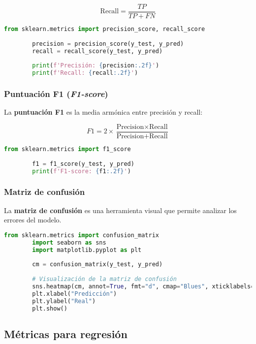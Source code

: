 \documentclass{book}
\begin{document}
	\[
	\text{Recall} = \frac{TP}{TP + FN}
	\]
	
	\begin{lstlisting}[language=Python, caption=Cálculo de precisión y recall]
		from sklearn.metrics import precision_score, recall_score
		
		precision = precision_score(y_test, y_pred)
		recall = recall_score(y_test, y_pred)
		
		print(f'Precisión: {precision:.2f}')
		print(f'Recall: {recall:.2f}')
	\end{lstlisting}
	
	\subsubsection{Puntuación F1 (\textit{F1-score})}
	
	La \textbf{puntuación F1} es la media armónica entre precisión y recall:
	
	\[
	F1 = 2 \times \frac{\text{Precision} \times \text{Recall}}{\text{Precision} + \text{Recall}}
	\]
	
	\begin{lstlisting}[language=Python, caption=Cálculo de F1-score]
		from sklearn.metrics import f1_score
		
		f1 = f1_score(y_test, y_pred)
		print(f'F1-score: {f1:.2f}')
	\end{lstlisting}
	
	\subsubsection{Matriz de confusión}
	
	La \textbf{matriz de confusión} es una herramienta visual que permite analizar los errores del modelo.
	
	\begin{lstlisting}[language=Python, caption=Matriz de confusión]
		from sklearn.metrics import confusion_matrix
		import seaborn as sns
		import matplotlib.pyplot as plt
		
		cm = confusion_matrix(y_test, y_pred)
		
		# Visualización de la matriz de confusión
		sns.heatmap(cm, annot=True, fmt="d", cmap="Blues", xticklabels=['Negativo', 'Positivo'], yticklabels=['Negativo', 'Positivo'])
		plt.xlabel("Predicción")
		plt.ylabel("Real")
		plt.show()
	\end{lstlisting}
	
	\subsection{Métricas para regresión}
	
\end{document}
